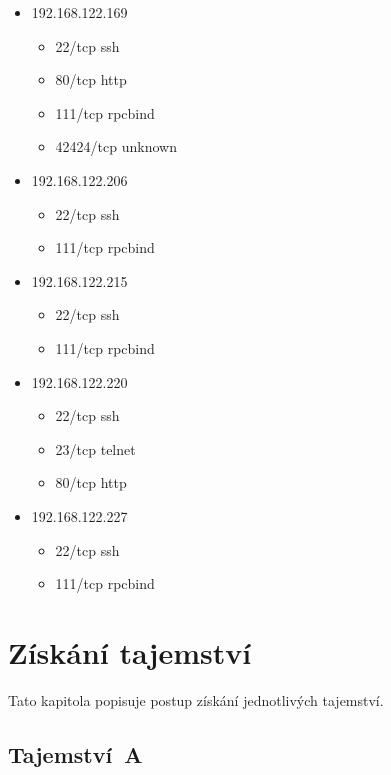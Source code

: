 \documentclass[a4paper, 10pt, twocolumn]{article}
\begin{document}
\begin{itemize}
		\item
			192.168.122.169
			\begin{itemize}
				\item 22/tcp ssh
				\item 80/tcp http
				\item 111/tcp rpcbind
				\item 42424/tcp unknown
			\end{itemize}

		\item
			192.168.122.206
			\begin{itemize}
				\item 22/tcp ssh
				\item 111/tcp rpcbind
			\end{itemize}

		\item
			192.168.122.215
			\begin{itemize}
				\item 22/tcp ssh
				\item 111/tcp rpcbind
			\end{itemize}

		\item
			192.168.122.220
			\begin{itemize}
				\item 22/tcp ssh
				\item 23/tcp telnet
				\item 80/tcp http
			\end{itemize}

		\item
			192.168.122.227
			\begin{itemize}
				\item 22/tcp ssh
				\item 111/tcp rpcbind
			\end{itemize}
	\end{itemize}


	\section{Získání tajemství}

	Tato kapitola popisuje postup získání jednotlivých tajemství.

	\subsection{Tajemství~A}
\end{document}
